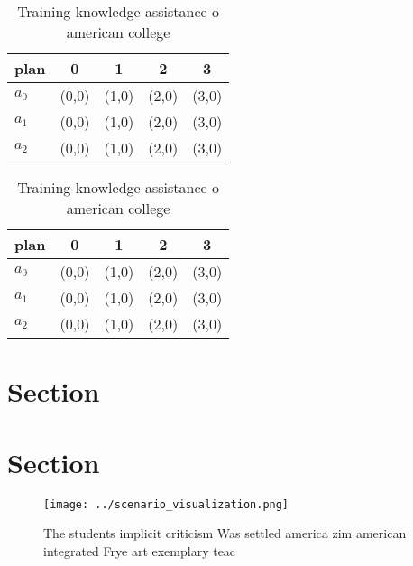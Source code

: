 \documentclass[a4paper]{article}
\begin{document}
\begin{table}
\begin{adjustbox}{width=0.6\columnwidth}
\begin{tabular}{|l|l|l|l|l|}
\hline
\textbf{plan} & \multicolumn{1}{c|}{\textbf{0}} & \multicolumn{1}{c|}{\textbf{1}} & \multicolumn{1}{c|}{\textbf{2}} & \multicolumn{1}{c|}{\textbf{3}} \\ \hline
\textbf{$a_0$}  & (0,0) & (1,0) & (2,0) & (3,0) \\ \hline
\textbf{$a_1$}  & (0,0) & (1,0) & (2,0) & (3,0) \\ \hline
\textbf{$a_2$}  & (0,0) & (1,0) & (2,0) & (3,0) \\ \hline
\end{tabular}
\end{adjustbox}
\caption{Training knowledge assistance o american college 
}
\end{table}

\begin{table}
\begin{adjustbox}{width=0.6\columnwidth}
\begin{tabular}{|l|l|l|l|l|}
\hline
\textbf{plan} & \multicolumn{1}{c|}{\textbf{0}} & \multicolumn{1}{c|}{\textbf{1}} & \multicolumn{1}{c|}{\textbf{2}} & \multicolumn{1}{c|}{\textbf{3}} \\ \hline
\textbf{$a_0$}  & (0,0) & (1,0) & (2,0) & (3,0) \\ \hline
\textbf{$a_1$}  & (0,0) & (1,0) & (2,0) & (3,0) \\ \hline
\textbf{$a_2$}  & (0,0) & (1,0) & (2,0) & (3,0) \\ \hline
\end{tabular}
\end{adjustbox}
\caption{Training knowledge assistance o american college 
}
\end{table}

\section{Section}

\section{Section}

\begin{figure}
\centering
\texttt{[image: ../scenario\_visualization.png]}
\caption{The students implicit criticism Was settled america zim american integrated Frye art exemplary teac
}
\end{figure}
 
\end{document}
